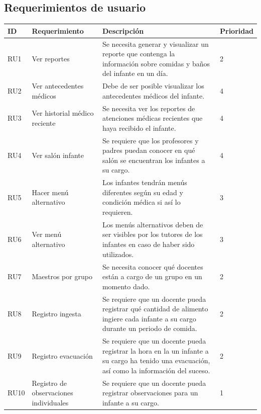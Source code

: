 \documentclass{article}
\begin{document}
\subsection{Requerimientos de usuario}
\begin{longtable}{|p{1.0cm}|p{3.8cm}|p{5.0cm}|p{1.2cm}|}	\hline
	\textbf{ID} & \textbf{Requerimiento} & \textbf{Descripción} & \textbf{Prioridad} \\
	\hline
	RU1 &
	Ver reportes &
	Se necesita generar y visualizar un reporte que contenga la información sobre comidas y baños del infante en un día. &
	2
	\\\hline
	
	RU2 &
	Ver antecedentes médicos &
	Debe de ser posible visualizar los antecedentes médicos del infante. &
	4
	\\ \hline

	RU3 &
	Ver historial médico reciente &
	Se necesita ver los reportes de atenciones médicas recientes que haya recibido el infante. &
	4
	\\ \hline

	RU4 &
	Ver salón infante &
	Se requiere que los profesores y padres puedan conocer en qué salón se encuentran los infantes a su cargo. &
	4
	\\ \hline

	RU5 &
	Hacer menú alternativo &
	Los infantes tendrán menús diferentes según su edad y condición médica si así lo requieren. &
	3
	\\ \hline

	RU6 &
	Ver menú alternativo &
	Los menús alternativos deben de ser visibles por los tutores de los infantes en caso de haber sido utilizados. &
	3
	\\ \hline

	RU7 &
	Maestros por grupo &
	Se necesita conocer qué docentes están a cargo de un grupo en un momento dado. &
	2
	\\ \hline

	RU8 &
	Registro ingesta &
	Se requiere que un docente pueda registrar qué cantidad de alimento ingiere cada infante a su cargo durante un periodo de comida. &
	2
	\\ \hline

	RU9 &
	Registro evacuación &
	Se requiere que un docente pueda registrar la hora en la un infante a su cargo ha tenido una evacuación, así como la información del suceso. &
	2
	\\ \hline

	RU10 &
	Registro de observaciones individuales &
	Se requiere que un docente pueda registrar observaciones para un infante a su cargo. &
	1
	\\ \hline


\end{longtable}
\end{document}
